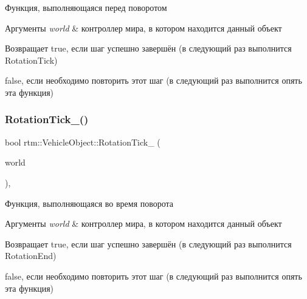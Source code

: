 Функция, выполняющаяся перед поворотом 


\begin{DoxyParams}{Аргументы}
{\em world} & контроллер мира, в котором находится данный объект \\
\hline
\end{DoxyParams}
\begin{DoxyReturn}{Возвращает}
true, если шаг успешно завершён (в следующий раз выполнится Rotation\+Tick) 

false, если необходимо повторить этот шаг (в следующий раз выполнится опять эта функция) 
\end{DoxyReturn}
\mbox{\label{classrtm_1_1_vehicle_object_a3dd8736f34c5e5ba26259335193628e5}} 
\subsubsection{\texorpdfstring{Rotation\+Tick\+\_\+()}{RotationTick\_()}}
{\footnotesize\ttfamily bool rtm\+::\+Vehicle\+Object\+::\+Rotation\+Tick\+\_\+ (\begin{DoxyParamCaption}\item[{\hyperlink{classrtm_1_1_world_controller}{World\+Controller} $\ast$const}]{world }\end{DoxyParamCaption})\hspace{0.3cm}{\ttfamily [protected]}, {\ttfamily [virtual]}}



Функция, выполняющаяся во время поворота 


\begin{DoxyParams}{Аргументы}
{\em world} & контроллер мира, в котором находится данный объект \\
\hline
\end{DoxyParams}
\begin{DoxyReturn}{Возвращает}
true, если шаг успешно завершён (в следующий раз выполнится Rotation\+End) 

false, если необходимо повторить этот шаг (в следующий раз выполнится опять эта функция) 
\end{DoxyReturn}
\mbox{\label{classrtm_1_1_vehicle_object_ab109b98ab7bda9402a6197efa98e5a03}} 
